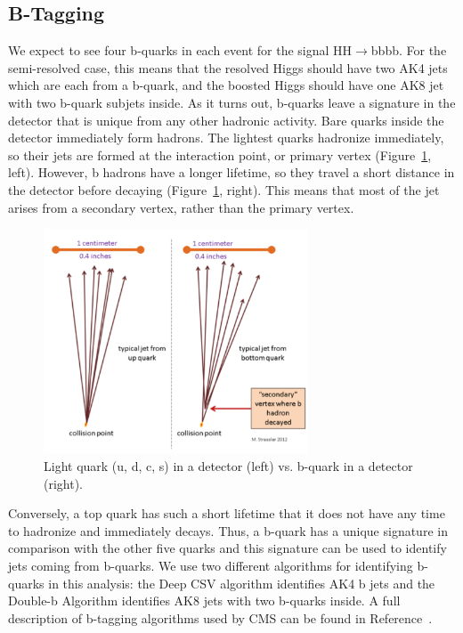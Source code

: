 \subsection{B-Tagging}
We expect to see four b-quarks in each event for the signal HH$\rightarrow$bbbb. For the semi-resolved case, this means that the resolved Higgs should have two AK4 jets which are each from a b-quark, and the boosted Higgs should have one AK8 jet with two b-quark subjets inside. As it turns out, b-quarks leave a signature in the detector that is unique from any other hadronic activity. Bare quarks inside the detector immediately form hadrons. The lightest quarks hadronize immediately, so their jets are formed at the interaction point, or primary vertex (Figure~\ref{Fig:bjet}, left). However, b hadrons have a longer lifetime, so they travel a short distance in the detector before decaying (Figure~\ref{Fig:bjet}, right). This means that most of the jet arises from a secondary vertex, rather than the primary vertex. 
\begin{figure}[h!]
    \centering
        \includegraphics[width=0.7\textwidth]{F4/bquark.png}
        \caption{Light quark (u, d, c, s) in a detector (left) vs. b-quark in a detector (right).}
        \label{Fig:bjet}
\end{figure}
Conversely, a top quark has such a short lifetime that it does not have any time to hadronize and immediately decays. Thus, a b-quark has a unique signature in comparison with the other five quarks and this signature can be used to identify jets coming from b-quarks. We use two different algorithms for identifying b-quarks in this analysis: the Deep CSV algorithm identifies AK4 b jets and the Double-b Algorithm identifies AK8 jets with two b-quarks inside. A full description of b-tagging algorithms used by CMS can be found in Reference~\cite{Sirunyan:2017ezt}.


